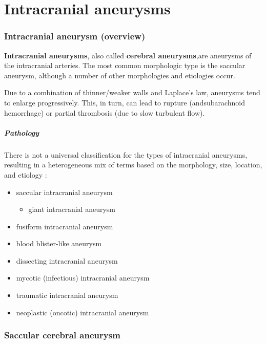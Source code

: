 \chapter{Intracranial aneurysms}

\subsection{Intracranial aneurysm (overview)}

\textbf{Intracranial aneurysms}, also called \textbf{cerebral aneurysms},are aneurysms of the intracranial arteries. The most common morphologic type is the saccular aneurysm, although a number of other morphologies and etiologies occur.

Due to a combination of thinner/weaker walls and Laplace's law, aneurysms tend to enlarge progressively. This, in turn, can lead to rupture (andsubarachnoid hemorrhage) or partial thrombosis (due to slow turbulent flow).

\paragraph{Pathology}

There is not a universal classification for the types of intracranial aneurysms, resulting in a heterogeneous mix of terms based on the morphology, size, location, and etiology :

\begin{itemize}
	\item
	saccular intracranial aneurysm
	
	\begin{itemize}
		\item
		giant intracranial aneurysm
	\end{itemize}
	\item
	fusiform intracranial aneurysm
	\item
	blood blister-like aneurysm
	\item
	dissecting intracranial aneurysm
	\item
	mycotic (infectious) intracranial aneurysm
	\item
	traumatic intracranial aneurysm
	\item
	neoplastic (oncotic) intracranial aneurysm
\end{itemize}
\subsection{Saccular cerebral aneurysm}

